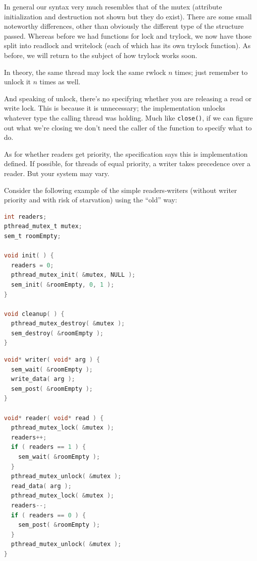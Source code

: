 \documentclass[a4paper]{report}
\begin{document}
In general our syntax very much resembles that of the mutex (attribute initialization and destruction not shown but they do exist). There are some small noteworthy differences, other than obviously the different type of the structure passed. Whereas before we had functions for lock and trylock, we now have those split into readlock and writelock (each of which has its own trylock function). As before, we will return to the subject of how trylock works soon.

In theory, the same thread may lock the same rwlock $n$ times; just remember to unlock it $n$ times as well.

And speaking of unlock, there's no specifying whether you are releasing a read or write lock. This is because it is unnecessary; the implementation unlocks whatever type the calling thread was holding. Much like \texttt{close()}, if we can figure out what we're closing we don't need the caller of the function to specify what to do.

As for whether readers get priority, the specification says this is implementation defined. If possible, for threads of equal priority, a writer takes precedence over a reader. But your system may vary.

Consider the following example of the simple readers-writers (without writer priority and with risk of starvation) using the ``old'' way:

\begin{multicols}{2}
\begin{lstlisting}[language=C]
int readers;
pthread_mutex_t mutex;
sem_t roomEmpty;

void init( ) {
  readers = 0;
  pthread_mutex_init( &mutex, NULL );
  sem_init( &roomEmpty, 0, 1 );
}

void cleanup( ) {
  pthread_mutex_destroy( &mutex );
  sem_destroy( &roomEmpty );
}
\end{lstlisting}

\columnbreak

\begin{lstlisting}[language=C]
void* writer( void* arg ) {
  sem_wait( &roomEmpty );
  write_data( arg );
  sem_post( &roomEmpty );
}

void* reader( void* read ) {
  pthread_mutex_lock( &mutex );
  readers++;
  if ( readers == 1 ) {
    sem_wait( &roomEmpty );
  }
  pthread_mutex_unlock( &mutex );
  read_data( arg );
  pthread_mutex_lock( &mutex );
  readers--;
  if ( readers == 0 ) {
    sem_post( &roomEmpty );
  }
  pthread_mutex_unlock( &mutex );
}
\end{lstlisting}

\end{multicols}
\end{document}
